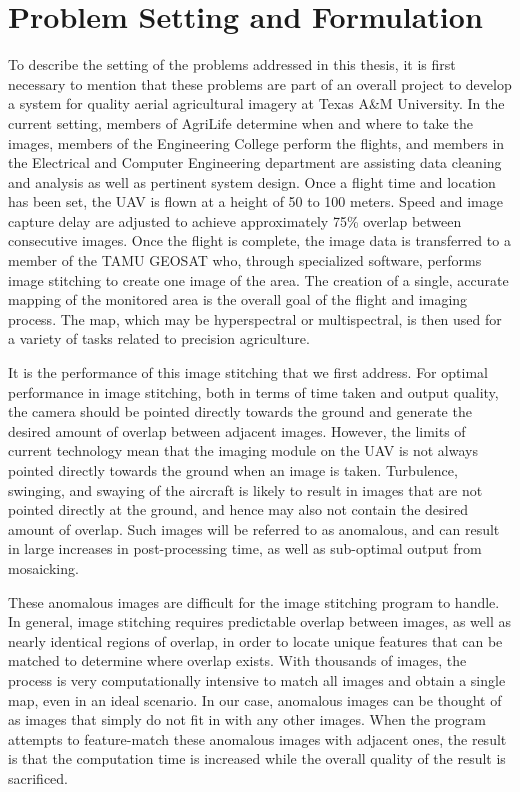\section{Problem Setting and Formulation}

To describe the setting of the problems addressed in this thesis, it is first necessary to mention that these problems are part of an overall project to develop a system for quality aerial agricultural imagery at Texas A\&M University.
In the current setting, members of AgriLife determine when and where to take the images, members of the Engineering College perform the flights, and members in the Electrical and Computer Engineering department are assisting data cleaning and analysis as well as pertinent system design.
Once a flight time and location has been set, the UAV is flown at a height of 50 to 100 meters.
Speed and image capture delay are adjusted to achieve approximately 75\% overlap between consecutive images.
Once the flight is complete, the image data is transferred to a member of the TAMU GEOSAT who, through specialized software, performs image stitching to create one image of the area.
The creation of a single, accurate mapping of the monitored area is the overall goal of the flight and imaging process.
The map, which may be hyperspectral or multispectral, is then used for a variety of tasks related to precision agriculture.

It is the performance of this image stitching that we first address.
For optimal performance in image stitching, both in terms of time taken and output quality, the camera should be pointed directly towards the ground and generate the desired amount of overlap between adjacent images.
However, the limits of current technology mean that the imaging module on the UAV is not always pointed directly towards the ground when an image is taken.
Turbulence, swinging, and swaying of the aircraft is likely to result in images that are not pointed directly at the ground, and hence may also not contain the desired amount of overlap.
Such images will be referred to as anomalous, and can result in large increases in post-processing time, as well as sub-optimal output from mosaicking.

These anomalous images are difficult for the image stitching program to handle.
In general, image stitching requires predictable overlap between images, as well as nearly identical regions of overlap, in order to locate unique features that can be matched to determine where overlap exists.
With thousands of images, the process is very computationally intensive to match all images and obtain a single map, even in an ideal scenario.
In our case, anomalous images can be thought of as images that simply do not fit in with any other images.
When the program attempts to feature-match these anomalous images with adjacent ones, the result is that the computation time is increased while the overall quality of the result is sacrificed.

